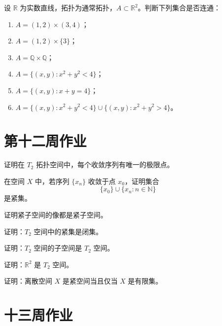 \begin{homework}[4.9]
设 $\mathbb{R}$ 为实数直线，拓扑为通常拓扑，$A\subset\mathbb{R}^2$。判断下列集合是否连通：
\begin{enumerate}
  \item $A=(1,2)\times(3,4)$；
  \item $A=(1,2)\times\{3\}$；
  \item $A=\mathbb{Q}\times\mathbb{Q}$；
  \item $A=\{(x,y):x^{2}+y^{2}<4\}$；
  \item $A=\{(x,y):x+y=4\}$；
  \item $A=\{(x,y):x^{2}+y^{2}<4\}\cup\{(x,y):x^{2}+y^{2}>4\}$。
\end{enumerate}
\end{homework}

\section{第十二周作业}

\begin{homework}[5.1]
证明在 $T_2$ 拓扑空间中，每个收敛序列有唯一的极限点。
\end{homework}

\begin{homework}[5.2]
在空间 $X$ 中，若序列 $\{x_n\}$ 收敛于点 $x_0$，证明集合
\[
\{x_0\}\cup\{x_n:n\in\mathbb{N}\}
\]
是紧集。
\end{homework}

\begin{homework}[2]
证明紧子空间的像都是紧子空间。
\end{homework}

\begin{homework}[3]
证明：$T_2$ 空间中的紧集是闭集。
\end{homework}

\begin{homework}[6]
证明：$T_2$ 空间的子空间是 $T_2$ 空间。
\end{homework}

\begin{homework}[7]
证明：$\mathbb{R}^2$ 是 $T_2$ 空间。
\end{homework}

\begin{homework}[5.3]
证明：离散空间 $X$ 是紧空间当且仅当 $X$ 是有限集。
\end{homework}

\section{十三周作业}


